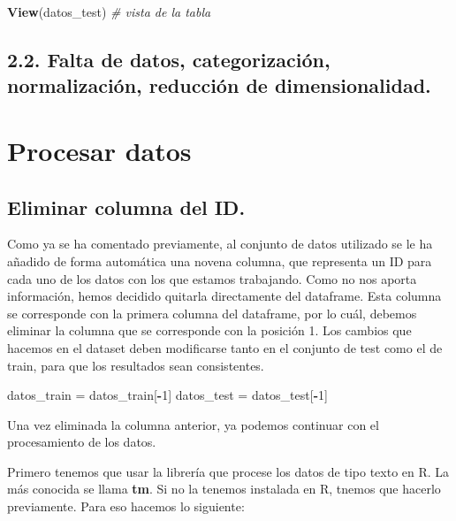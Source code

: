 \documentclass[spanish,]{article}
\newenvironment{Shaded}{\begin{snugshade}}{\end{snugshade}}
\newcommand{\KeywordTok}[1]{\textcolor[rgb]{0.13,0.29,0.53}{\textbf{#1}}}
\newcommand{\DecValTok}[1]{\textcolor[rgb]{0.00,0.00,0.81}{#1}}
\newcommand{\StringTok}[1]{\textcolor[rgb]{0.31,0.60,0.02}{#1}}
\newcommand{\CommentTok}[1]{\textcolor[rgb]{0.56,0.35,0.01}{\textit{#1}}}
\newcommand{\OperatorTok}[1]{\textcolor[rgb]{0.81,0.36,0.00}{\textbf{#1}}}
\newcommand{\NormalTok}[1]{#1}
\begin{document}
\begin{Shaded}
\begin{Highlighting}[]
\KeywordTok{View}\NormalTok{(datos_test)    }\CommentTok{# vista de la tabla}
\end{Highlighting}
\end{Shaded}

\subsection{2.2. Falta de datos, categorización, normalización,
reducción de
dimensionalidad.}\label{falta-de-datos-categorizacion-normalizacion-reduccion-de-dimensionalidad.}

\section{Procesar datos}\label{procesar-datos}

\subsection{Eliminar columna del ID.}\label{eliminar-columna-del-id.}

Como ya se ha comentado previamente, al conjunto de datos utilizado se
le ha añadido de forma automática una novena columna, que representa un
ID para cada uno de los datos con los que estamos trabajando. Como no
nos aporta información, hemos decidido quitarla directamente del
dataframe. Esta columna se corresponde con la primera columna del
dataframe, por lo cuál, debemos eliminar la columna que se corresponde
con la posición 1. Los cambios que hacemos en el dataset deben
modificarse tanto en el conjunto de test como el de train, para que los
resultados sean consistentes.

\begin{Shaded}
\begin{Highlighting}[]
\NormalTok{datos_train =}\StringTok{ }\NormalTok{datos_train[}\OperatorTok{-}\DecValTok{1}\NormalTok{]}
\NormalTok{datos_test =}\StringTok{ }\NormalTok{datos_test[}\OperatorTok{-}\DecValTok{1}\NormalTok{]}
\end{Highlighting}
\end{Shaded}

Una vez eliminada la columna anterior, ya podemos continuar con el
procesamiento de los datos.

Primero tenemos que usar la librería que procese los datos de tipo texto
en R. La más conocida se llama \textbf{tm}. Si no la tenemos instalada
en R, tnemos que hacerlo previamente. Para eso hacemos lo siguiente:
\end{document}
